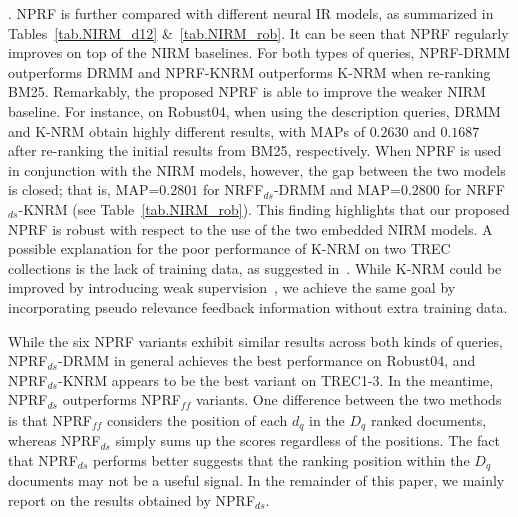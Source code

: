 \documentclass[11pt,a4paper]{article}
\begin{document}
. 
NPRF is further compared with different neural IR models, as summarized in Tables~\ref{tab.NIRM_d12} \&~\ref{tab.NIRM_rob}. 
It can be seen that NPRF regularly improves on top of the NIRM baselines. 
For both types of queries, NPRF-DRMM outperforms DRMM and NPRF-KNRM outperforms K-NRM when re-ranking BM25.
Remarkably, the proposed NPRF is able to improve the weaker NIRM baseline. 
For instance, on Robust04,
when using the description queries, 
DRMM and K-NRM obtain highly different results, 
with MAPs of $0.2630$ and $0.1687$ after re-ranking the initial results from BM25, respectively.
When NPRF is used in conjunction with the NIRM models, however, 
the gap between the two models is closed; that is, 
MAP=$0.2801$ for NRFF$_{ds}$-DRMM and MAP=$0.2800$ for NRFF$_{ds}$-KNRM (see Table~\ref{tab.NIRM_rob}). 
This finding highlights that our proposed NPRF is robust with respect to the use of the two embedded NIRM models. A possible explanation 
for the poor performance of K-NRM on two TREC collections is the lack of training data, as suggested in~\cite{DBLP:conf/wsdm/DaiXC018}. While K-NRM could be improved by introducing weak supervision~\cite{DBLP:conf/wsdm/DaiXC018}, we achieve the same goal by incorporating pseudo relevance feedback information without extra training data.

While the six NPRF variants exhibit similar results across both kinds of queries, NPRF$_{ds}$-DRMM in general achieves 
the best performance on Robust04, and NPRF$_{ds}$-KNRM appears to be the best variant on TREC1-3. In the meantime,
NPRF$_{ds}$ outperforms NPRF$_\ensuremath{\mathit{ff}}$ variants. 
One difference between the two methods is that NPRF$_\ensuremath{\mathit{ff}}$ considers the position of each $d_q$ in the $D_q$ ranked documents, whereas NPRF$_{ds}$ simply sums up the scores regardless of the positions. The fact that NPRF$_{ds}$ performs better suggests
that the ranking position within the $D_q$ documents may not be a useful signal.
In the remainder of this paper, we mainly report on the results obtained by NPRF$_{ds}$.
\end{document}
